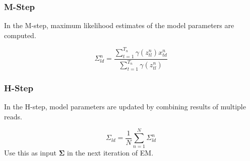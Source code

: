 \documentclass[10pt]{article}
\begin{document}
\subsubsection{M-Step}
In the M-step, maximum likelihood estimates of the model parameters are computed.

\begin{equation}
\Sigma_{ld}^{n} = \frac{\displaystyle\sum_{t=1}^{T_n} \gamma(z_{tl}^n)x_{td}^n}{\displaystyle\sum_{t=1}^{T_n}\gamma(z_{tl}^n)}
\end{equation}



\subsubsection{H-Step}
In the H-step, model parameters are updated by combining results of multiple reads.

\begin{equation}
\Sigma_{ld} = \frac{1}{N}\displaystyle\sum_{n=1}^{N} \Sigma_{ld}^{n}
\end{equation}
Use this as input $\mathbf{\Sigma}$ in the next iteration of EM.

\end{document}
